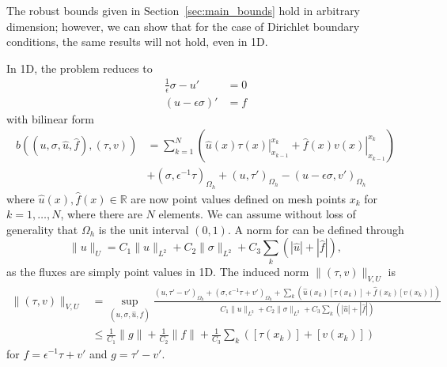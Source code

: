 \documentclass[11pt,onecolumn]{scrartcl}
\begin{document}
The robust bounds given in Section~\ref{sec:main_bounds} hold in arbitrary dimension; however, we can show that for the case of Dirichlet boundary conditions, the same results will not hold, even in 1D.  

In 1D, the problem reduces to 
\begin{align*}
\frac{1}{\epsilon}\sigma - u' &= 0\\
\left(u - \epsilon \sigma \right)' &=f
\end{align*}
with bilinear form
\begin{align*}
b\left(\left(u,\sigma,\widehat{u},\widehat{f}\right),\left(\tau,v\right)\right) &= \sum_{k=1}^N \left(\left.\widehat{u}(x) \tau(x)\right |^{x_k}_{x_{k-1}} + \left.\widehat{f}(x) v(x)\right |^{x_k}_{x_{k-1}}\right) \\
&+ \left(\sigma,\epsilon^{-1}\tau\right)_{\Omega_h} + (u,\tau')_{\Omega_h}- \left(u - \epsilon \sigma,v'\right)_{\Omega_h}
\end{align*}
where $\widehat{u}(x), \widehat{f}(x) \in \mathbb{R}$ are now point values defined on mesh points $x_k$ for $k=1,\ldots,N$, where there are $N$ elements.  We can assume without loss of generality that $\Omega_h$ is the unit interval $(0,1)$.  A norm for can be defined through $$\|u\|_U = C_1\|u\|_{L^2} + C_2\|\sigma\|_{L^2} + C_3\sum_k \left(|\widehat{u}|+ |\widehat{f}|\right),$$ as the fluxes are simply point values in 1D.  
The induced norm $\|\left(\tau,v\right)\|_{V,U}$ is
\begin{align*}
\|\left(\tau,v\right)\|_{V,U} &= \sup_{\left(u,\sigma,\widehat{u},\widehat{f}\right)} \frac{ (u,\tau'-v')_{\Omega_h}+ \left(\sigma,\epsilon^{-1}\tau + v'\right)_{\Omega_h}+\sum_k \left(\widehat{u}(x_k) [\tau(x_k)] + \widehat{f}(x_k) [v(x_k)]\right)}{C_1\|u\|_{L^2} + C_2\|\sigma\|_{L^2} + C_3\sum_k \left(|\widehat{u}|+ |\widehat{f}|\right)}\\
&\leq \frac{1}{C_1}\|g\| + \frac{1}{C_2}\|f\| + \frac{1}{C_3}\sum_k \left([\tau(x_k)] +[v(x_k)]\right)
\end{align*}
for $f = \epsilon^{-1}\tau + v'$ and $g = \tau'-v'$.
\end{document}

